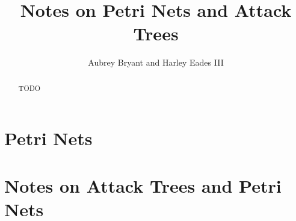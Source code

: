 \documentclass{article}
\title{Notes on Petri Nets and Attack Trees}
\author{Aubrey Bryant and Harley Eades III}
\begin{document}
\maketitle 

\begin{abstract}
  TODO
\end{abstract}
\section{Petri Nets}\label {sec:petri-nets}

\section{Notes on Attack Trees and Petri Nets}

\nocite{*}


\end{document}
